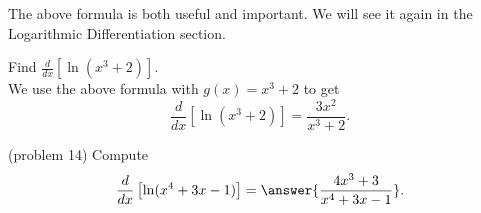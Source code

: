 \documentclass{ximera}
\begin{document}
The above formula is both useful and important.  We will see it again in the Logarithmic Differentiation section.

\begin{example}
 Find $\frac{d}{dx} \left[\ln(x^3 + 2)\right]$.\\
 
We use the above formula with $g(x) = x^3 + 2$ to get
\[
\frac{d}{dx} \left[\ln(x^3 + 2)\right] = \frac{3x^2}{x^3 + 2}.
\]
\end{example}

\begin{problem}(problem 14)
Compute 
\[
\frac{d}{dx} \left[\ln(x^4 + 3x - 1)\right] = \answer{\frac{4x^3 + 3}{x^4 + 3x -1}}.
\]
\end{problem}

\begin{center}
\begin{foldable}
\end{foldable}
\end{center}
\end{document}
